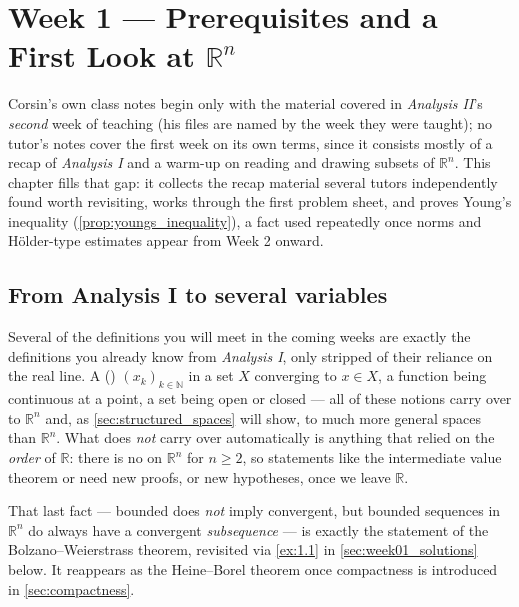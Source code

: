 \chapter{Week 1 --- Prerequisites and a First Look at \texorpdfstring{$\mathbb{R}^n$}{Rn}}
\label{ch:week01}

Corsin's own class notes begin only with the material covered in \emph{Analysis II}'s
\emph{second} week of teaching (his files are named by the week they were taught); no tutor's notes cover the first week on its own terms, since
it consists mostly of a recap of \emph{Analysis I} and a warm-up on reading and drawing subsets
of $\mathbb{R}^n$. This chapter fills that gap: it collects the recap material several tutors
independently found worth revisiting, works through the first problem sheet, and proves Young's
inequality (\cref{prop:youngs_inequality}), a fact used repeatedly once norms and Hölder-type
estimates appear from Week 2 onward.

\section{From Analysis I to several variables}
\label{sec:analysis1_recap}

Several of the definitions you will meet in the coming weeks are exactly the definitions you
already know from \emph{Analysis I}, only stripped of their reliance on the real line. A
 () $(x_k)_{k \in \mathbb{N}}$ in a set $X$ converging to
$x \in X$, a function being continuous at a point, a set being open or closed --- all of these
notions carry over to $\mathbb{R}^n$ and, as \cref{sec:structured_spaces} will show, to much more
general spaces than $\mathbb{R}^n$. What does \emph{not} carry over automatically is anything
that relied on the \emph{order} of $\mathbb{R}$: there is no \qt{$\leq$} on $\mathbb{R}^n$ for
$n \geq 2$, so statements like the intermediate value theorem or  need new proofs, or new hypotheses, once we leave $\mathbb{R}$.

\begin{remark}
That last fact --- bounded does \emph{not} imply convergent, but bounded sequences in
$\mathbb{R}^n$ do always have a convergent \emph{subsequence} --- is exactly the statement of the
Bolzano--Weierstrass theorem, revisited via \cref{ex:1.1} in \cref{sec:week01_solutions} below. It
reappears as the Heine--Borel theorem once compactness is introduced in \cref{sec:compactness}.
\end{remark}

